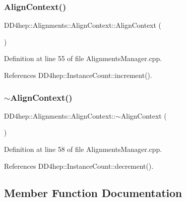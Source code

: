 \subsubsection{\texorpdfstring{Align\+Context()}{AlignContext()}}
{\footnotesize\ttfamily D\+D4hep\+::\+Alignments\+::\+Align\+Context\+::\+Align\+Context (\begin{DoxyParamCaption}{ }\end{DoxyParamCaption})\hspace{0.3cm}{\ttfamily [inline]}}



Definition at line 55 of file Alignments\+Manager.\+cpp.



References D\+D4hep\+::\+Instance\+Count\+::increment().

\hypertarget{class_d_d4hep_1_1_alignments_1_1_align_context_ab283a69726f22fa38ab82b93286c9ab9}{}\label{class_d_d4hep_1_1_alignments_1_1_align_context_ab283a69726f22fa38ab82b93286c9ab9} 
\subsubsection{\texorpdfstring{$\sim$\+Align\+Context()}{~AlignContext()}}
{\footnotesize\ttfamily D\+D4hep\+::\+Alignments\+::\+Align\+Context\+::$\sim$\+Align\+Context (\begin{DoxyParamCaption}{ }\end{DoxyParamCaption})\hspace{0.3cm}{\ttfamily [inline]}}



Definition at line 58 of file Alignments\+Manager.\+cpp.



References D\+D4hep\+::\+Instance\+Count\+::decrement().



\subsection{Member Function Documentation}
\hypertarget{class_d_d4hep_1_1_alignments_1_1_align_context_aff6f08db18fa6c1ff668371240ee438a}{}\label{class_d_d4hep_1_1_alignments_1_1_align_context_aff6f08db18fa6c1ff668371240ee438a} 
